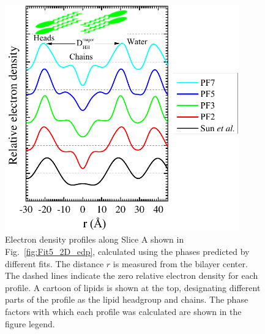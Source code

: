 \begin{figure}[htbp]
  \centering
  \includegraphics[width=0.9\textwidth]{figures/ripple/LAXS/major_diff_models}
  \caption{Electron density profiles along Slice A shown in 
  Fig.~\ref{fig:Fit5_2D_edp}, calculated using the phases
  predicted by different fits. The distance $r$ is measured from the bilayer 
  center. 
  The dashed lines indicate the zero relative electron density for each profile.  
  A cartoon of lipids is shown at the top, designating different parts of the
  profile as the lipid headgroup and chains. 
  The phase factors with which each profile was calculated are shown in the 
  figure legend.}
  \label{fig:major_diff_models}
\end{figure}

